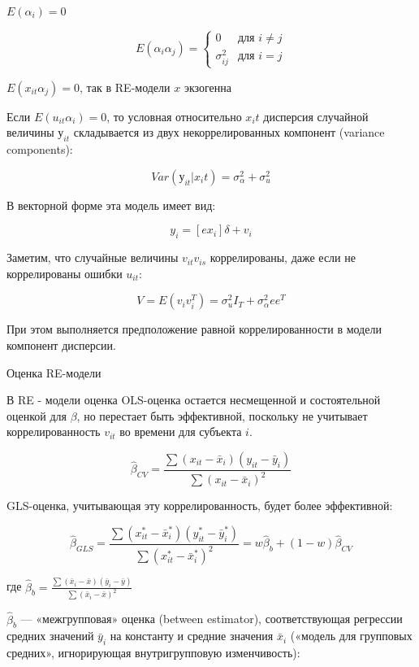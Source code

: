 \documentclass[a4paper,8pt]{article} %
\begin{document}
$E(\alpha_i) = 0 $

\begin{equation*}E(\alpha_{i}\alpha_{j}) = 
\begin{cases}
0 &\text{для $i \neq j$}\\
\sigma_{ij}^2 &\text{для $i = j$}
\end{cases}
\end{equation*}

$E(x_{it}\alpha_{j}) = 0 $, так в RE-модели $x$ экзогенна 


Если $E(u_{it}\alpha_{i}) = 0 $,  то  условная относительно $x_it$ дисперсия случайной величины $у_{it}$ складывается из двух некоррелированных
компонент (variance components):

$$Var(у_{it}|x_it) = \sigma^2_\alpha + \sigma^2_u $$

В векторной форме эта модель имеет вид:


$$y_i = [ex_i] \delta + v_i $$


Заметим, что случайные величины $v_{it} v_{is}$  коррелированы, даже если не коррелированы ошибки $u_{it}$:

$$V= E(v_i v_i^T ) = \sigma^2_u I_T + \sigma^2_\alpha e e^T $$ 

При этом выполняется предположение равной коррелированности в модели компонент дисперсии.



Оценка RE-модели  

В RE - модели оценка OLS-оценка остается несмещенной и состоятельной оценкой для $\beta$, но перестает быть эффективной, поскольку не учитывает коррелированность $v_{it}$ во времени для субъекта $i$.


$$\hat{\beta}_{CV} = \frac{\sum(x_{it} - \bar{x}_i)(y_{it} - \bar{y}_i)}{\sum (x_{it} - \bar{x}_i)^2 }$$



GLS-оценка, учитывающая эту коррелированность, будет более эффективной:

$$\hat{\beta}_{GLS} = \frac{\sum(x_{it}^* - \bar{x}_i^*)(y_{it}^* - \bar{y}_i^*)}{\sum (x_{it}^* - \bar{x}_i^*)^2 } = w \hat{\beta}_{b} + (1-w) \hat{\beta}_{CV}$$ 

где $\hat{\beta}_{b} = \frac{\sum(\bar{x}_i - \bar{x})(\bar{y}_i - \bar{y})}{\sum (\bar{x}_i - \bar{x})^2 }$


$\hat{\beta}_{b}$ — «межгрупповая» оценка (between estimator), соответствующая регрессии средних значений $\bar{y}_i$
на константу и средние значения $\bar{x}_i$ («модель для групповых средних», игнорирующая внутригрупповую изменчивость): 
\end{document}

